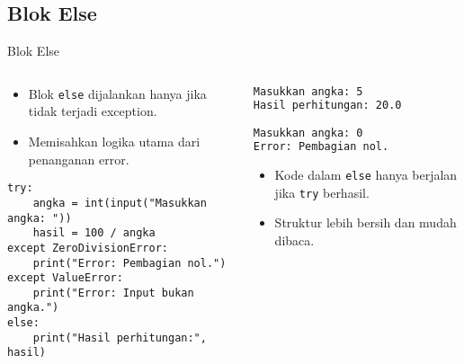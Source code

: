 \documentclass[aspectratio=169, table]{beamer}
\begin{document}
\subsection*{Blok Else}
\begin{frame}[fragile]{Blok Else}
\vspace*{10pt}
\begin{columns}[T]
\begin{column}{0.6\textwidth}
\begin{itemize}
  \item Blok \texttt{else} dijalankan hanya jika tidak terjadi exception.
  \item Memisahkan logika utama dari penanganan error.
\end{itemize}

\begin{lstlisting}[style=PythonStyle]
try:
    angka = int(input("Masukkan angka: "))
    hasil = 100 / angka
except ZeroDivisionError:
    print("Error: Pembagian nol.")
except ValueError:
    print("Error: Input bukan angka.")
else:
    print("Hasil perhitungan:", hasil)
\end{lstlisting}
\end{column}

\begin{column}{0.35\textwidth}
\begin{lstlisting}[language=bash]
Masukkan angka: 5
Hasil perhitungan: 20.0

Masukkan angka: 0
Error: Pembagian nol.
\end{lstlisting}

\begin{itemize}
  \item Kode dalam \texttt{else} hanya berjalan jika \texttt{try} berhasil.
  \item Struktur lebih bersih dan mudah dibaca.
\end{itemize}
\end{column}
\end{columns}
\end{frame}

\end{document}
